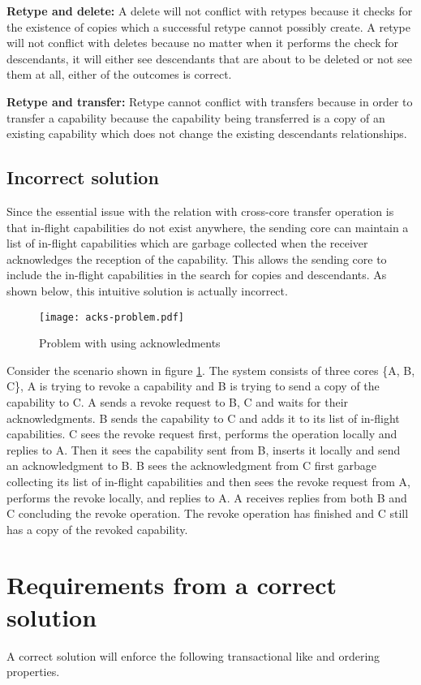 \documentclass[a4paper,twoside]{report} %
\begin{document}
\textbf{Retype and delete:} A delete will not conflict with retypes
because it checks for the existence of copies which a successful
retype cannot possibly create. A retype will not conflict with deletes
because no matter when it performs the check for descendants, it will
either see descendants that are about to be deleted or not see them at
all, either of the outcomes is correct.

\textbf{Retype and transfer:} Retype cannot conflict with transfers
because in order to transfer a capability because the capability being
transferred is a copy of an existing capability which does not change
the existing descendants relationships.

\subsection{Incorrect solution}
Since the essential issue with the relation with cross-core transfer
operation is that in-flight capabilities do not exist anywhere, the
sending core can maintain a list of in-flight capabilities which are
garbage collected when the receiver acknowledges the reception of the
capability. This allows the sending core to include the in-flight
capabilities in the search for copies and descendants. As shown below,
this intuitive solution is actually incorrect.

\begin{figure}[t]
 \texttt{[image: acks-problem.pdf]}
 \caption{Problem with using acknowledments}\label{fig:acks-problem}
\end{figure}

Consider the scenario shown in figure \ref{fig:acks-problem}. The
system consists of three cores \{A, B, C\}, A is trying to revoke a
capability and B is trying to send a copy of the capability to C. A
sends a revoke request to B, C and waits for their acknowledgments. B
sends the capability to C and adds it to its list of in-flight
capabilities. C sees the revoke request first, performs the operation
locally and replies to A. Then it sees the capability sent from B,
inserts it locally and send an acknowledgment to B. B sees the
acknowledgment from C first garbage collecting its list of in-flight
capabilities and then sees the revoke request from A, performs the
revoke locally, and replies to A. A receives replies from both B and C
concluding the revoke operation. The revoke operation has finished and
C still has a copy of the revoked capability.

\section{Requirements from a correct solution}\label{sec:requirements}
A correct solution will enforce the following transactional like and
ordering properties.
\end{document}
